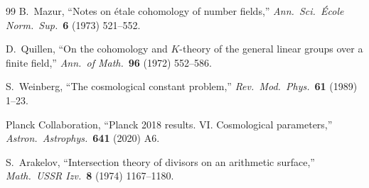 \documentclass[12pt,a4paper]{article}
\theoremstyle{definition}
\begin{document}
\begin{thebibliography}{99}
B.~Mazur, ``Notes on \'etale cohomology of number fields,''
\textit{Ann.\ Sci.\ \'Ecole Norm.\ Sup.}\ \textbf{6} (1973) 521--552.

D.~Quillen, ``On the cohomology and $K$-theory of the general linear groups over a finite field,''
\textit{Ann.\ of Math.}\ \textbf{96} (1972) 552--586.

S.~Weinberg, ``The cosmological constant problem,''
\textit{Rev.\ Mod.\ Phys.}\ \textbf{61} (1989) 1--23.

Planck Collaboration, ``Planck 2018 results. VI. Cosmological parameters,''
\textit{Astron.\ Astrophys.}\ \textbf{641} (2020) A6.

S.~Arakelov, ``Intersection theory of divisors on an arithmetic surface,''
\textit{Math.\ USSR Izv.}\ \textbf{8} (1974) 1167--1180.

\end{thebibliography}
\end{document}
